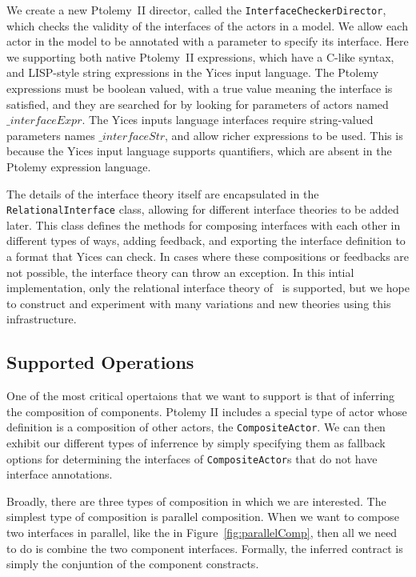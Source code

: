 \documentclass[preprint,11pt]{sigplanconf}
\begin{document}
We create a new Ptolemy~II director, called the
\texttt{InterfaceCheckerDirector}, which checks the validity of the interfaces of
the actors in a model. We allow each actor in the model to be annotated with a
parameter to specify its interface. Here we supporting both native Ptolemy~II
expressions, which have a C-like syntax, and LISP-style string expressions in the
Yices input language. The Ptolemy expressions must be boolean valued, with a true
value meaning the interface is satisfied, and they are searched for by looking
for parameters of actors named $\_interfaceExpr$. The Yices inputs language
interfaces require string-valued parameters names $\_interfaceStr$, and allow
richer expressions to be used. This is because the Yices input language supports
quantifiers, which are absent in the Ptolemy expression language.

The details of the interface theory itself are encapsulated in the
\texttt{RelationalInterface} class, allowing for different interface theories
to be added later.  This class defines the methods for composing interfaces
with each other in different types of ways, adding feedback, and exporting the
interface definition to a format that Yices can check. In cases where these
compositions or feedbacks are not possible, the interface theory can throw an
exception.
%
In this intial implementation, only the relational interface theory
of~\cite{relationalInterfaces} is supported, but we hope to construct and
experiment with many variations and new theories using this infrastructure.

\subsection{Supported Operations}
One of the most critical opertaions that we want to support is that of
inferring the composition of components.  Ptolemy II includes a special type
of actor whose definition is a composition of other actors, the
\texttt{CompositeActor}. We can then exhibit our different types of inferrence
by simply specifying them as fallback options for determining the interfaces of
\texttt{CompositeActor}s that do not have interface annotations.

Broadly, there are three types of composition in which we are interested.
%
The simplest type of composition is parallel composition.  When we want to
compose two interfaces in parallel, like the  in
Figure~\ref{fig:parallelComp}, then all we need to do is combine the two
component interfaces.  Formally, the inferred contract is simply the conjuntion
of the component constracts.
\end{document}

